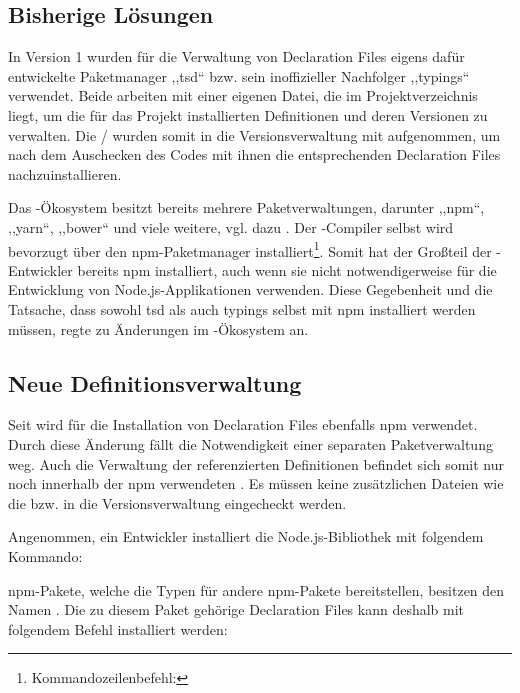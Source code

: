 \subsection{Bisherige Lösungen}
In \ts Version 1 wurden für die Verwaltung von Declaration Files eigens dafür entwickelte Paketmanager ,,tsd`` bzw. sein inoffizieller Nachfolger ,,typings`` verwendet. Beide arbeiten mit einer eigenen Datei, die im Projektverzeichnis liegt, um die für das Projekt installierten Definitionen und deren Versionen zu verwalten. Die / wurden somit in die Versionsverwaltung mit aufgenommen, um nach dem Auschecken des Codes mit ihnen die entsprechenden Declaration Files nachzuinstallieren.

Das \js-Ökosystem besitzt bereits mehrere Paketverwaltungen, darunter ,,npm``, ,,yarn``, ,,bower`` und viele weitere, vgl. dazu \cite{js-package-managers}. Der \ts-Compiler selbst wird bevorzugt über den npm-Paketmanager installiert\footnote{Kommandozeilenbefehl: }. Somit hat der Großteil der \ts-Entwickler bereits npm installiert, auch wenn sie \ts nicht notwendigerweise für die Entwicklung von Node.js-Applikationen verwenden. Diese Gegebenheit und die Tatsache, dass sowohl tsd als auch typings selbst mit npm installiert werden müssen, regte zu Änderungen im \ts-Ökosystem an.

\subsection{Neue Definitionsverwaltung}
Seit  wird für die Installation von Declaration Files ebenfalls npm verwendet. Durch diese Änderung fällt die Notwendigkeit einer separaten Paketverwaltung weg. Auch die Verwaltung der referenzierten Definitionen befindet sich somit nur noch innerhalb der npm verwendeten . Es müssen keine zusätzlichen Dateien wie die  bzw.  in die Versionsverwaltung eingecheckt werden.

Angenommen, ein Entwickler installiert die Node.js-Bibliothek  mit folgendem Kommando:


npm-Pakete, welche die Typen für andere npm-Pakete bereitstellen, besitzen den Namen . Die zu diesem Paket gehörige Declaration Files kann deshalb mit folgendem Befehl installiert werden:

